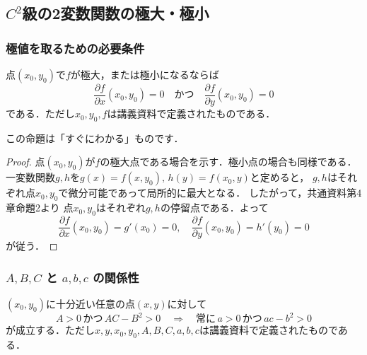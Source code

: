 \documentclass[./index]{subfiles}
\begin{document}
\subsection{$C^2$級の2変数関数の極大・極小}

\subsubsection{極値を取るための必要条件}
\begin{screen}
    \begin{proposition}
        点$(x_0, y_0)$で$f$が極大，または極小になるならば
        \begin{equation}
            \frac{\partial f}{\partial x}(x_0, y_0) = 0
            \quad \mbox{かつ} \quad
            \frac{\partial f}{\partial y}(x_0, y_0) = 0
        \end{equation}
        である．ただし$x_0, y_0, f$は講義資料で定義されたものである．
    \end{proposition}
\end{screen}

この命題は「すぐにわかる」ものです．

\begin{proof}
    点$(x_0, y_0)$が$f$の極大点である場合を示す．極小点の場合も同様である．
    一変数関数$g, h$を$g(x) = f(x, y_0),\,h(y) = f(x_0, y)$と定めると，
    $g, h$はそれぞれ点$x_0, y_0$で微分可能であって局所的に最大となる．
    したがって，共通資料第4章命題2より
    点$x_0, y_0$はそれぞれ$g, h$の停留点である．よって
    \begin{equation}
        \frac{\partial f}{\partial x}(x_0, y_0) = g'(x_0) = 0
        ,\quad
        \frac{\partial f}{\partial y}(x_0, y_0) = h'(y_0) = 0
    \end{equation}
    が従う．
\end{proof}

\subsubsection{$A, B, C$ と $a, b, c$ の関係性}
\begin{screen}
    \begin{proposition}
        $(x_0, y_0)$に十分近い任意の点$(x, y)$に対して
        \begin{equation}
            A > 0
            \,\mbox{かつ}\,
            AC - B^2 > 0
            \quad \Longrightarrow \quad
            \mbox{常に}\,
            a > 0
            \,\mbox{かつ}\,
            ac - b^2 > 0
        \end{equation}
        が成立する．ただし$x, y, x_0, y_0, A, B, C, a, b, c$は講義資料で定義されたものである．
    \end{proposition}
\end{screen}
\end{document}
